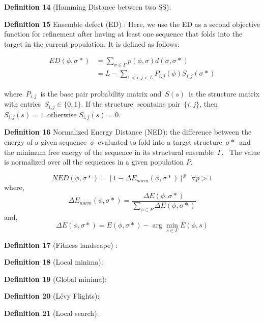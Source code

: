 \textbf{Definition 14} (Hamming Distance between two SS): 

\textbf{Definition 15} Ensemble defect (ED) \cite{zadeh2011nucleic}: Here, we use the ED as a second objective function for refinement after having at least one sequence that folds into the target in the current population. It is defined as follows: ~

\begin{equation}
\label{ed}
\begin{split}
ED(\phi, \sigma*) &= \sum_{\sigma \in \Gamma}{p(\phi, \sigma)d(\sigma, \sigma*)}\\
&= L - \sum_{1<i,j<L} P_{i,j}(\phi)S_{i,j}(\sigma*)
\end{split}
\end{equation}

where~\(P_{i,j}\)~is the base pair probability matrix and~\(S(s)\)~is the structure matrix with entries~\(S_{i,j} \in  \{ 0, 1\}\). If the structure~\(s\)contains pair~\(\{i ,j\}\), then~\(S_{i,j}(s) = 1\)~otherwise \(S_{i,j}(s) = 0\).

\textbf{Definition 16} Normalized Energy Distance (NED): the difference between
the energy of a given sequence~\(\phi\)~evaluated to fold
into a target structure~\(\sigma*\)~and the minimum free energy
of the sequence in its structural ensemble~\(\Gamma\).~ The value is normalized over all the sequences in a given population $P$.  


\begin{equation}
\label{ned}
NED(\phi, \sigma*) = [1-\Delta E_{norm}(\phi, \sigma*)]^p \text{   } \forall p>1
\end{equation}
where,
\begin{equation}
\Delta E_{norm}(\phi, \sigma*) = \frac{\Delta E(\phi, \sigma*) }{\sum_{\phi \in P}{\Delta E(\phi, \sigma*)}}
\end{equation}
and,
\begin{equation}
\Delta E(\phi, \sigma*) = E(\phi, \sigma*) - \arg \min_{s \in \Gamma} E(\phi, s)
\end{equation}

\textbf{Definition 17} (Fitness landscape) : 


\textbf{Definition 18} (Local minima): 

\textbf{Definition 19} (Global minima): 

\textbf{Definition 20} (Lévy Flights): 

\textbf{Definition 21} (Local search): 

